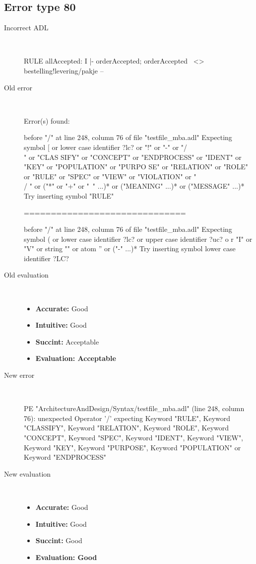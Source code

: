 \subsection{Error type 80}
  \begin{description}
  \item[Incorrect ADL]~\\
\begin{adl}
RULE allAccepted: I |- orderAccepted; orderAccepted~ <> bestelling!levering/pakje --\end{adl}
  \item[Old error]~\\
\begin{haskell}
Error(s) found:

before "/" at line 248, column 76 of file "testfile_mba.adl"
Expecting symbol [ or lower case identifier ?lc? or "!" or "-" or "/\\" or "CLAS
SIFY" or "CONCEPT" or "ENDPROCESS" or "IDENT" or "KEY" or "POPULATION" or "PURPO
SE" or "RELATION" or "ROLE" or "RULE" or "SPEC" or "VIEW" or "VIOLATION" or "\\/
" or ("*" or "+" or "~" ...)* or ("MEANING" ...)* or ("MESSAGE" ...)*
Try inserting symbol "RULE"

==============================

before "/" at line 248, column 76 of file "testfile_mba.adl"
Expecting symbol ( or lower case identifier ?lc? or upper case identifier ?uc? o
r "I" or "V" or string "" or atom '' or ("-" ...)*
Try inserting symbol lower case identifier ?LC?\end{haskell}
  \item[Old evaluation]~\\
    \begin{itemize}
    \item \textbf{Accurate:} Good
    \item \textbf{Intuitive:} Good
    \item \textbf{Succint:} Acceptable
    \item \textbf{Evaluation: Acceptable}
    \end{itemize}
  \item[New error]~\\
\begin{haskell}
PE "ArchitectureAndDesign/Syntax/testfile_mba.adl" (line 248, column 76):
unexpected Operator '/'
expecting Keyword "RULE", Keyword "CLASSIFY", Keyword "RELATION", Keyword "ROLE", Keyword "CONCEPT", Keyword "SPEC", Keyword "IDENT", Keyword "VIEW", Keyword "KEY", Keyword "PURPOSE", Keyword "POPULATION" or Keyword "ENDPROCESS"
\end{haskell}
  \item[New evaluation]~\\
    \begin{itemize}
    \item \textbf{Accurate:} Good
    \item \textbf{Intuitive:} Good
    \item \textbf{Succint:} Good
    \item \textbf{Evaluation: Good
}
    \end{itemize}
  \end{description}


